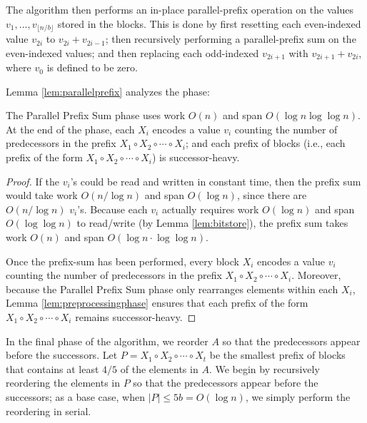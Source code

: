 \documentclass[twoside,leqno,twocolumn]{article}
\renewcommand{\paragraph}[1]{\vspace{0.09in}\noindent{\bf \boldmath #1.}}
\begin{document}
The algorithm then performs an in-place parallel-prefix operation on
the values $v_1, \ldots, v_{\lfloor n / b \rfloor}$ stored in the
blocks. This is done by first resetting each even-indexed value
$v_{2i}$ to $v_{2i} + v_{2i - 1}$; then recursively performing a
parallel-prefix sum on the even-indexed values; and then replacing
each odd-indexed $v_{2i + 1}$ with $v_{2i + 1} + v_{2i}$, where $v_0$
is defined to be zero.

Lemma \ref{lem:parallelprefix} analyzes the phase:
\begin{lemma}
  The Parallel Prefix Sum phase uses work $O(n)$ and span
  $O(\log n \log \log n)$. At the end of the phase, each $X_i$ encodes
  a value $v_i$ counting the number of predecessors in the prefix
  $X_1 \circ X_2 \circ \cdots \circ X_i$; and each prefix of blocks
  (i.e., each prefix of the form
  $X_1 \circ X_2 \circ \cdots \circ X_i$) is successor-heavy.
\label{lem:parallelprefix}
\end{lemma}
\begin{proof}
If the $v_i$'s could be read and written in constant time, then the
prefix sum would take work $O(n / \log n)$ and span $O(\log n)$, since
there are $O(n / \log n)$ $v_i$'s. Because each $v_i$ actually
requires work $O(\log n)$ and span $O(\log \log n)$ to read/write (by
Lemma \ref{lem:bitstore}), the prefix sum takes work $O(n)$ and span
$O(\log n \cdot \log \log n)$.

Once the prefix-sum has been performed, every block $X_i$
encodes a value $v_i$ counting the number of predecessors in the
prefix $X_1 \circ X_2 \circ \cdots \circ X_i$. Moreover, because the
Parallel Prefix Sum phase only rearranges elements within each $X_i$,
Lemma \ref{lem:preprocessingphase} ensures that each prefix of the
form $X_1 \circ X_2 \circ \cdots \circ X_i$ remains successor-heavy.
\end{proof}

\paragraph{In-Place Reordering}
In the final phase of the algorithm, we reorder $A$ so that the
predecessors appear before the successors. Let $P = X_1 \circ X_2
\circ \cdots \circ X_t$ be the smallest prefix of blocks that contains
at least $4/5$ of the elements in $A$. We begin by recursively
reordering the elements in $P$ so that the predecessors appear before
the successors; as a base case, when $|P| \le 5b = O(\log n)$, we
simply perform the reordering in serial.
\end{document}

